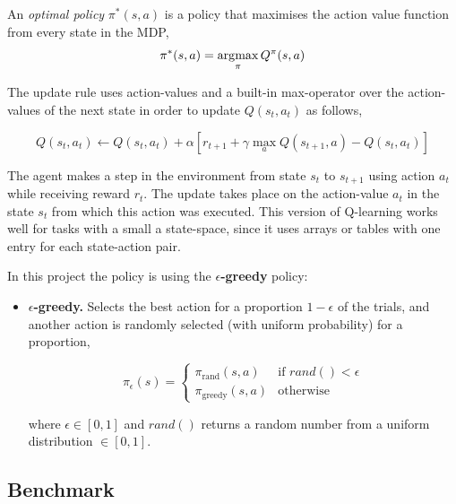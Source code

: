 An \emph{optimal policy} $\pi^*(s,a)$ is a policy that maximises the action value function from every state in the MDP,
%
\begin{equation}
    \pi^*(s,a) = \operatorname*{\arg\!\max}_\pi Q^\pi(s, a)
\end{equation}

The update rule uses action-values and a built-in max-operator over the action-values of the next state in order to update $Q(s_t, a_t)$ as follows,

\begin{equation}
Q(s_t,a_t) \gets Q(s_t,a_t) + \alpha \left[r_{t+1} + \gamma \max_a Q(s_{t+1},a) - Q(s_t,a_t)\right]
\end{equation}

The agent makes a step in the environment from state $s_t$ to $s_{t+1}$ using action $a_t$ while receiving reward $r_t$. The update takes place on the action-value $a_t$ in the state $s_t$ from which this action was executed. This version of Q-learning works well for tasks with a small a state-space, since it uses arrays or tables with one entry for each state-action pair.

In this project the policy is using the \textbf{$\epsilon$-greedy} policy:

\begin{itemize}

    \item \textbf{$\epsilon$-greedy.} Selects the best action for a proportion
        $1 - \epsilon$ of the trials, and another action is randomly selected (with
        uniform probability) for a proportion,
        
        \begin{equation}
            \pi_{\epsilon}(s) = \left\{
             \begin{array}{lr}
                 \pi_{\textrm{rand}}(s,a) & \text{if } rand() < \epsilon\\
                 \pi_{\textrm{greedy}}(s,a) & \text{otherwise}
             \end{array}
           \right.
        \end{equation}

        where $\epsilon \in [0, 1]$ and $rand()$ returns a random number from a uniform distribution $\in [0, 1]$.

\end{itemize}

\subsection{Benchmark}

